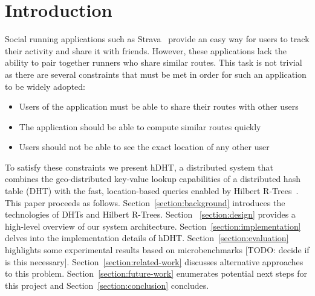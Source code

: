 \section{Introduction}
Social running applications such as Strava~\cite{strava} provide an easy way for users to track their activity and share it with friends. However, these applications lack the ability to pair together runners who share similar routes. This task is not trivial as there are several constraints that must be met in order for such an application to be widely adopted:
\begin{itemize}
	\item Users of the application must be able to share their routes with other users
	\item The application should be able to compute similar routes quickly
	\item Users should not be able to see the exact location of any other user
\end{itemize}
To satisfy these constraints we present hDHT, a distributed system that combines the geo-distributed key-value lookup capabilities of a distributed hash table (DHT) with the fast, location-based queries enabled by Hilbert R-Trees~\cite{kamel1993hilbert}.
This paper proceeds as follows. Section~\ref{section:background} introduces the technologies of DHTs and Hilbert R-Trees. Section ~\ref{section:design} provides a high-level overview of our system architecture. Section~\ref{section:implementation} delves into the implementation details of hDHT. Section~\ref{section:evaluation} highlights some experimental results based on microbenchmarks [TODO: decide if is this necessary]. Section~\ref{section:related-work} discusses alternative approaches to this problem. Section~\ref{section:future-work} enumerates potential next steps for this project and Section~\ref{section:conclusion} concludes.